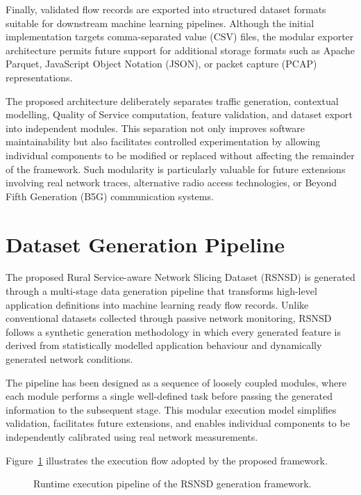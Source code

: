 \documentclass[12pt,a4paper]{article}
\begin{document}
Finally, validated flow records are exported into structured dataset formats suitable for downstream machine learning pipelines. Although the initial implementation targets comma-separated value (CSV) files, the modular exporter architecture permits future support for additional storage formats such as Apache Parquet, JavaScript Object Notation (JSON), or packet capture (PCAP) representations.

The proposed architecture deliberately separates traffic generation, contextual modelling, Quality of Service computation, feature validation, and dataset export into independent modules. This separation not only improves software maintainability but also facilitates controlled experimentation by allowing individual components to be modified or replaced without affecting the remainder of the framework. Such modularity is particularly valuable for future extensions involving real network traces, alternative radio access technologies, or Beyond Fifth Generation (B5G) communication systems.

\section{Dataset Generation Pipeline}

The proposed Rural Service-aware Network Slicing Dataset (RSNSD) is generated through a multi-stage data generation pipeline that transforms high-level application definitions into machine learning ready flow records. Unlike conventional datasets collected through passive network monitoring, RSNSD follows a synthetic generation methodology in which every generated feature is derived from statistically modelled application behaviour and dynamically generated network conditions.

The pipeline has been designed as a sequence of loosely coupled modules, where each module performs a single well-defined task before passing the generated information to the subsequent stage. This modular execution model simplifies validation, facilitates future extensions, and enables individual components to be independently calibrated using real network measurements.

Figure~\ref{fig:generation_pipeline} illustrates the execution flow adopted by the proposed framework.

\begin{figure}[H]
	\centering
	\caption{Runtime execution pipeline of the RSNSD generation framework.}
	\label{fig:generation_pipeline}
\end{figure}
\end{document}
